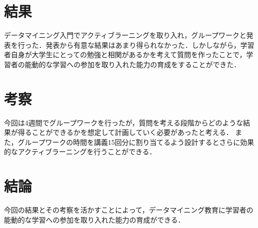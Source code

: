 \documentclass[uplatex,twocolumn,dvipdfmx]{jsarticle}
\begin{document}
\section{結果}

データマイニング入門でアクティブラーニングを取り入れ，グループワークと発表を行った．発表から有意な結果はあまり得られなかった．しかしながら，学習者自身が大学生にとっての勉強と相関があるかを考えて質問を作ったことで，学習者の能動的な学習への参加を取り入れた能力の育成をすることができた．


\section{考察}

今回は4週間でグループワークを行ったが，質問を考える段階からどのような結果が得ることができるかを想定して計画していく必要があったと考える．
また，グループワークの時間を講義15回分に割り当てるよう設計するとさらに効果的なアクティブラーニングを行うことができる．





\section{結論}

今回の結果とその考察を活かすことによって，データマイニング教育に学習者の能動的な学習への参加を取り入れた能力の育成ができる．



\end{document}
